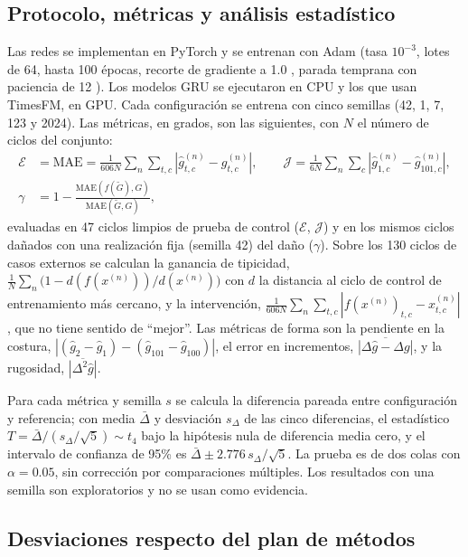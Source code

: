 \documentclass[11pt,a4paper]{article}
\newcommand{\Mae}{\mathrm{MAE}}
\begin{document}
\subsection{Protocolo, métricas y análisis estadístico}
\label{sec:metricas}

Las redes se implementan en PyTorch \cite{paszke2019} y se entrenan con Adam \cite{kingma2015} (tasa $10^{-3}$, lotes de 64, hasta 100 épocas, recorte de gradiente a 1.0 \cite{pascanu2013}, parada temprana con paciencia de 12 \cite{prechelt1998}). Los modelos GRU se ejecutaron en CPU y los que usan TimesFM, en GPU. Cada configuración se entrena con cinco semillas (42, 1, 7, 123 y 2024). Las métricas, en grados, son las siguientes, con $N$ el número de ciclos del conjunto:
\begin{align}
\mathcal E&=\Mae=\frac{1}{606N}\sum_{n}\sum_{t,c}\left|\hat g^{(n)}_{t,c}-g^{(n)}_{t,c}\right|,\qquad
\mathcal J=\frac{1}{6N}\sum_{n}\sum_{c}\left|\hat g^{(n)}_{1,c}-\hat g^{(n)}_{101,c}\right|,\\
\gamma&=1-\frac{\Mae(f(\tilde G),G)}{\Mae(\tilde G,G)},
\end{align}
evaluadas en 47 ciclos limpios de prueba de control ($\mathcal E$, $\mathcal J$) y en los mismos ciclos dañados con una realización fija (semilla 42) del daño ($\gamma$). Sobre los 130 ciclos de casos externos se calculan la ganancia de tipicidad, $\frac1N\sum_n\big(1-d(f(x^{(n)}))/d(x^{(n)})\big)$ con $d$ la distancia al ciclo de control de entrenamiento más cercano, y la intervención, $\frac{1}{606N}\sum_n\sum_{t,c}|f(x^{(n)})_{t,c}-x^{(n)}_{t,c}|$, que no tiene sentido de ``mejor''. Las métricas de forma son la pendiente en la costura, $|(\hat g_2-\hat g_1)-(\hat g_{101}-\hat g_{100})|$, el error en incrementos, $\overline{|\Delta\hat g-\Delta g|}$, y la rugosidad, $\overline{|\Delta^2\hat g|}$.

Para cada métrica y semilla $s$ se calcula la diferencia pareada entre configuración y referencia; con media $\bar\Delta$ y desviación $s_\Delta$ de las cinco diferencias, el estadístico $T=\bar\Delta/(s_\Delta/\sqrt5)\sim t_4$ bajo la hipótesis nula de diferencia media cero, y el intervalo de confianza de 95\% es $\bar\Delta\pm2.776\,s_\Delta/\sqrt5$. La prueba es de dos colas con $\alpha=0.05$, sin corrección por comparaciones múltiples. Los resultados con una semilla son exploratorios y no se usan como evidencia.

\subsection{Desviaciones respecto del plan de métodos}
\label{sec:desv}
\end{document}

